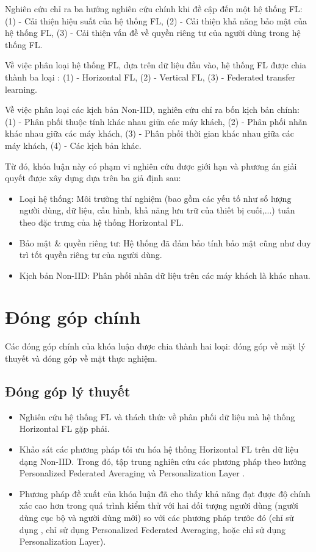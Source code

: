 Nghiên cứu \cite{yin2021comprehensive} chỉ ra ba hướng nghiên cứu chính khi đề cập đến một hệ thống FL: (1) - Cải thiện hiệu suất của hệ thống FL, (2) - Cải thiện khả năng bảo mật của hệ thống FL, (3) - Cải thiện vấn đề về quyền riêng tư của người dùng trong hệ thống FL.

Về việc phân loại hệ thống FL, dựa trên dữ liệu đầu vào, hệ thống FL được chia thành ba loại \cite{yin2021comprehensive}: (1) - Horizontal FL, (2) - Vertical FL, (3) - Federated transfer learning.

Về việc phân loại các kịch bản Non-IID, nghiên cứu \cite{zhu2021federated} chỉ ra bốn kịch bản chính: (1) - Phân phối thuộc tính khác nhau giữa các máy khách, (2) - Phân phối nhãn khác nhau giữa các máy khách, (3) - Phân phối thời gian khác nhau giữa các máy khách, (4) - Các kịch bản khác.

Từ đó, khóa luận này có phạm vi nghiên cứu được giới hạn và phương án giải quyết được xây dựng dựa trên ba giả định sau:

\begin{itemize}
    \item Loại hệ thống: Môi trường thí nghiệm (bao gồm các yếu tố như số lượng người dùng, dữ liệu, cấu hình, khả năng lưu trữ của thiết bị cuối,...) tuân theo đặc trưng của hệ thống Horizontal FL.
    \item Bảo mật \& quyền riêng tư: Hệ thống đã đảm bảo tính bảo mật cũng như duy trì tốt quyền riêng tư của người dùng.
    \item Kịch bản Non-IID: Phân phối nhãn dữ liệu trên các máy khách là khác nhau.
\end{itemize}

\section{Đóng góp chính}

Các đóng góp chính của khóa luận được chia thành hai loại: đóng góp về mặt lý thuyết và đóng góp về mặt thực nghiệm.

\subsection{Đóng góp lý thuyết}

\begin{itemize}
    \item Nghiên cứu hệ thống FL và thách thức về phân phối dữ liệu mà hệ thống Horizontal FL gặp phải.
    \item Khảo sát các phương pháp tối ưu hóa hệ thống Horizontal FL trên dữ liệu dạng Non-IID. Trong đó, tập trung nghiên cứu các phương pháp theo hướng Personalized Federated Averaging \parencite{fallah2020personalized, chen2018federated} và Personalization Layer \parencite{liang2020think, arivazhagan2019federated}.
    \item Phương pháp đề xuất của khóa luận đã cho thấy khả năng đạt được độ chính xác cao hơn trong quá trình kiểm thử với hai đối tượng người dùng (người dùng cục bộ và người dùng mới) so với các phương pháp trước đó (chỉ sử dụng , chỉ sử dụng Personalized Federated Averaging, hoặc chỉ sử dụng Personalization Layer).
\end{itemize}

